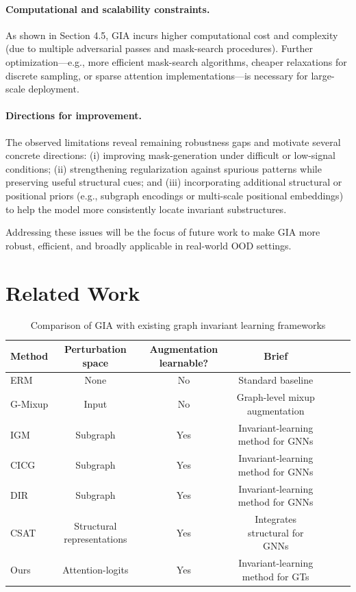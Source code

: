 \documentclass[a4paper,fleqn]{cas-dc}
\begin{document}
{\paragraph{Computational and scalability constraints.} As shown in Section 4.5, GIA incurs higher computational cost and complexity (due to multiple adversarial passes and mask-search procedures). Further optimization—e.g., more efficient mask-search algorithms, cheaper relaxations for discrete sampling, or sparse attention implementations—is necessary for large-scale deployment.

\paragraph{Directions for improvement.} The observed limitations reveal remaining robustness gaps and motivate several concrete directions: (i) improving mask-generation under difficult or low-signal conditions; (ii) strengthening regularization against spurious patterns while preserving useful structural cues; and (iii) incorporating additional structural or positional priors (e.g., subgraph encodings or multi-scale positional embeddings) to help the model more consistently locate invariant substructures.



Addressing these issues will be the focus of future work to make GIA more robust, efficient, and broadly applicable in real-world OOD settings.
}

\section{Related Work}

\begin{table}%
\caption{{\color{blue}Comparison of GIA with existing graph invariant learning frameworks}}
\label{tbl9}
\begin{tabular*}{\tblwidth}{@{}LCCCCCC@{}}
\toprule
\textbf{Method} & \textbf{Perturbation space} & \textbf{Augmentation learnable?}  & \textbf{Brief}  \\
\midrule
ERM          & None & No  &Standard baseline   \\
G-Mixup        &Input   &No    & Graph-level mixup augmentation  \\
IGM & Subgraph &Yes    &Invariant-learning method for GNNs   \\
CICG            &Subgraph  &Yes   & Invariant-learning method for GNNs  \\
DIR          & Subgraph &Yes    &Invariant-learning method for GNNs   \\
CSAT           &Structural representations    &Yes&Integrates structural for GNNs  \\

Ours           &Attention-logits  &Yes    &Invariant-learning method for GTs   \\
\bottomrule
\end{tabular*}
\end{table}
\end{document}
